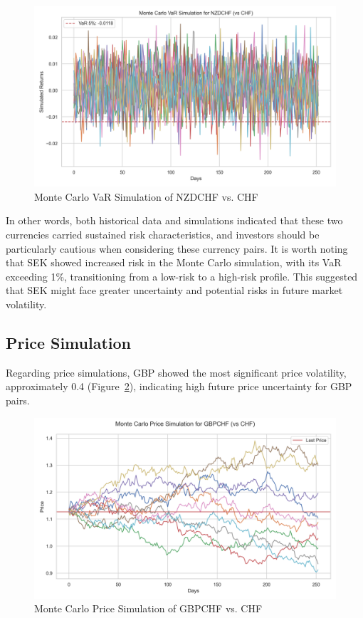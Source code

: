 \documentclass{article}
\begin{document}
\begin{figure}[H]
    \centering   \includegraphics[width=0.75\linewidth]{reports/figures/monte_carlo_var_simulation_NZDCHF_vs_CHF.png}
    \caption{Monte Carlo VaR Simulation of NZDCHF vs. CHF}  \label{fig:monte_carlo_var_simulation_NZDCHF_vs_CHF}
\end{figure}

In other words, both historical data and simulations indicated that these two currencies carried sustained risk characteristics, and investors should be particularly cautious when considering these currency pairs. It is worth noting that SEK showed increased risk in the Monte Carlo simulation, with its VaR exceeding 1\%, transitioning from a low-risk to a high-risk profile. This suggested that SEK might face greater uncertainty and potential risks in future market volatility.

\subsection{Price Simulation}
Regarding price simulations, GBP showed the most significant price volatility, approximately 0.4 (Figure~\ref{fig:monte_carlo_price_simulation_GBPCHF_vs_CHF}), indicating high future price uncertainty for GBP pairs. 

\begin{figure}[H]
    \centering  \includegraphics[width=0.75\linewidth]{reports/figures/monte_carlo_price_simulation_GBPCHF_vs_CHF.png}
    \caption{Monte Carlo Price Simulation of GBPCHF vs. CHF}  \label{fig:monte_carlo_price_simulation_GBPCHF_vs_CHF}
\end{figure}
\end{document}

